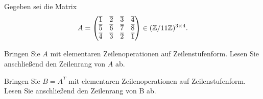 \begin{Problem}
	Gegeben sei die Matrix
	\[
		A=\begin{pmatrix} \overline{1} & \overline{2} & \overline{3} & \overline{4}\\ \overline{5} & \overline{6} & \overline{7} & \overline{8} \\ \overline{4}& \overline{3} & \overline{2} & \overline{1} \end{pmatrix} \in (\mathbb{Z} / 11\mathbb{Z})^{3\times 4}
	.\] 
	\begin{parts}
	\item Bringen Sie $A$ mit elementaren Zeilenoperationen auf Zeilenstufenform. Lesen Sie anschließend den Zeilenrang von $A$ ab.  
	\item Bringen Sie $B=A^T$ mit elementaren Zeilenoperationen auf Zeilenstufenform. Lesen Sie anschließend den Zeilenrang von B ab. 
	  \end{parts}
\end{Problem}

